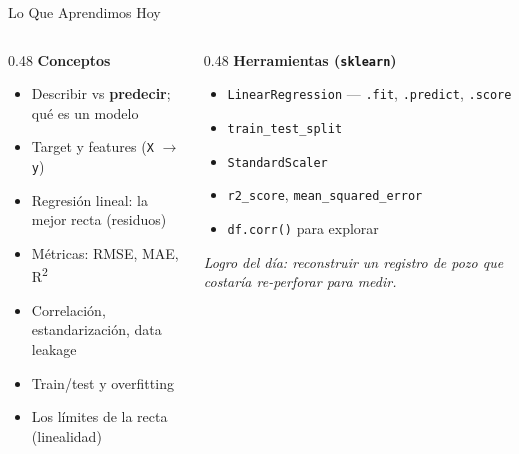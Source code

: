 \documentclass[aspectratio=169, 11pt]{beamer}
\begin{document}
\begin{frame}{Lo Que Aprendimos Hoy}
  \vspace{-6pt}
  \begin{columns}[T]
    \begin{column}{0.48\textwidth}
      {\footnotesize\color{arcaDark}\bfseries Conceptos}
      \vspace{3pt}
      {\footnotesize\color{textMuted}
      \begin{itemize}\setlength{\itemsep}{2pt}
        \item[{\color{codeGreen}\scriptsize\faCheck}]
          Describir vs \textbf{predecir}; qué es un modelo
        \item[{\color{codeGreen}\scriptsize\faCheck}]
          Target y features (\texttt{X} $\to$ \texttt{y})
        \item[{\color{codeGreen}\scriptsize\faCheck}]
          Regresión lineal: la mejor recta (residuos)
        \item[{\color{codeGreen}\scriptsize\faCheck}]
          Métricas: RMSE, MAE, R\textsuperscript{2}
        \item[{\color{codeGreen}\scriptsize\faCheck}]
          Correlación, estandarización, data leakage
        \item[{\color{codeGreen}\scriptsize\faCheck}]
          Train/test y overfitting
        \item[{\color{codeGreen}\scriptsize\faCheck}]
          Los límites de la recta (linealidad)
      \end{itemize}
      }
    \end{column}
    \begin{column}{0.48\textwidth}
      {\footnotesize\color{arcaDark}\bfseries Herramientas (\texttt{sklearn})}
      \vspace{3pt}
      {\footnotesize\color{textMuted}
      \begin{itemize}\setlength{\itemsep}{2pt}
        \item[{\color{arcaRed}\scriptsize\faTools}]
          \texttt{LinearRegression} --- \texttt{.fit}, \texttt{.predict}, \texttt{.score}
        \item[{\color{arcaRed}\scriptsize\faTools}]
          \texttt{train\_test\_split}
        \item[{\color{arcaRed}\scriptsize\faTools}]
          \texttt{StandardScaler}
        \item[{\color{arcaRed}\scriptsize\faTools}]
          \texttt{r2\_score}, \texttt{mean\_squared\_error}
        \item[{\color{arcaRed}\scriptsize\faTools}]
          \texttt{df.corr()} para explorar
      \end{itemize}
      }
      \vspace{6pt}
      {\scriptsize\color{arcaDark}\itshape
        Logro del día: reconstruir un registro de pozo
        que costaría re-perforar para medir.}
    \end{column}
  \end{columns}
\end{frame}
\end{document}
